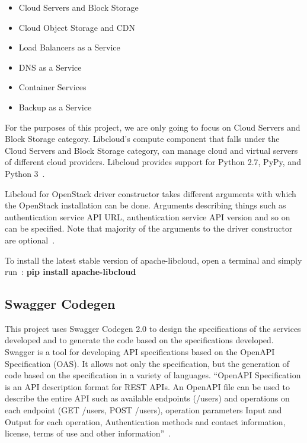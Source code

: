 \begin{itemize}
\item Cloud Servers and Block Storage
\item Cloud Object Storage and CDN
\item Load Balancers as a Service
\item DNS as a Service
\item Container Services
\item Backup as a Service
\end{itemize}

For the purposes of this project, we are only going to focus on Cloud Servers
and Block Storage category. Libcloud's compute component that falls under the
Cloud Servers and Block Storage category, can manage cloud and virtual servers
of different cloud providers. Libcloud provides support for Python 2.7, PyPy,
and Python 3~\cite{hid-sp18-516-www-libcloud-compute}. 

Libcloud for OpenStack driver constructor takes different arguments with which
the OpenStack installation can be done. Arguments describing things such as
authentication service API URL, authentication service API version and so on 
can be specified. Note that majority of the arguments to the driver 
constructor are optional~\cite{hid-sp18-516-www-libcloud-openstack}. 

To install the latest stable version of apache-libcloud, open a terminal and
simply run~\cite{hid-sp18-516-www-libcloud}:
\textbf{pip install apache-libcloud}

\subsection{Swagger Codegen}
This project uses Swagger Codegen 2.0 to design the specifications of the
services developed and to generate the code based on the specifications
developed. Swagger is a tool for developing API specifications based on the
OpenAPI Specification (OAS). It allows not only the specification, but the
generation of code based on the specification in a variety of languages. 
``OpenAPI Specification is an API description format for REST APIs. An OpenAPI 
file can be used to describe the entire API such as available endpoints 
(/users) and operations on each endpoint (GET /users, POST /users), operation 
parameters Input and Output for each operation, Authentication methods and 
contact information, license, terms of use and other
information''~\cite{hid-sp18-516-www-swagger}. 

